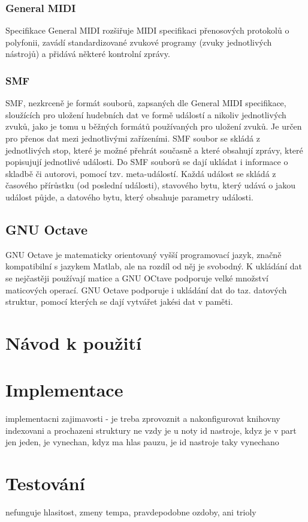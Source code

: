 \documentclass[12pt,a4paper,titlepage]{article}
\begin{document}
\subsubsection{General MIDI}
Specifikace General MIDI rozšiřuje MIDI specifikaci přenosových protokolů o polyfonii, zavádí standardizované zvukové programy (zvuky jednotlivých nástrojů) a přidává některé kontrolní zprávy.
\subsubsection{SMF}
SMF, nezkrceně  je formát souborů, zapsaných dle General MIDI specifikace, sloužících pro uložení hudebních dat ve formě událostí a nikoliv jednotlivých zvuků, jako je tomu u běžných formátů používaných pro uložení zvuků. Je určen pro přenos dat mezi jednotlivými zařízeními. SMF soubor se skládá z jednotlivých stop, které je možné přehrát současně a které obsahují zprávy, které popisujují jednotlivé události. Do SMF souborů se dají ukládat i informace o skladbě či autorovi, pomocí tzv. meta-událostí. Každá událost se skládá z časového přírůstku (od poslední události), stavového bytu, který udává o jakou událost půjde, a datového bytu, který obsahuje parametry události.
\subsection{GNU Octave}
GNU Octave je matematicky orientovaný vyšší programovací jazyk, značně kompatibilní s jazykem Matlab, ale na rozdíl od něj je svobodný. K ukládání dat se nejčastěji používají matice a GNU OCtave podporuje velké množství maticových operací. GNU Octave podporuje i ukládání dat do taz. datových struktur, pomocí kterých se dají vytvářet jakési  dat v paměti.
\section{Návod k použití}
\section{Implementace}
implementacni zajimavosti - je treba zprovoznit a nakonfigurovat knihovny
indexovani a prochazeni struktury
ne vzdy je u noty id nastroje, kdyz je v part jen jeden, je vynechan, kdyz ma hlas pauzu, je id nastroje taky vynechano
\section{Testování}
nefunguje hlasitost, zmeny tempa, pravdepodobne ozdoby, ani trioly
\end{document}
